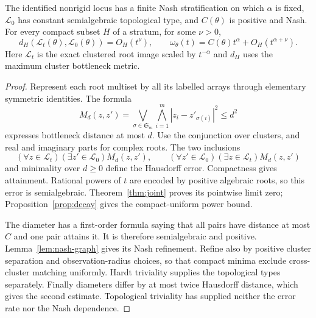 \begin{theorem}\label{thm:uniform}
The identified nonrigid locus has a finite Nash stratification on which
$\alpha$ is fixed, $\mathcal L_0$ has constant semialgebraic topological
type, and $C(\theta)$ is positive and Nash. For every compact subset $H$
of a stratum, for some $\nu>0$,
\begin{equation}\label{eq:uniform-law}
 d_H(\mathcal L_t(\theta),\mathcal L_0(\theta))=O_H(t^\nu),\qquad
 \omega_\theta(t)=C(\theta)t^\alpha+O_H(t^{\alpha+\nu}).
\end{equation}
Here $\mathcal L_t$ is the exact clustered root image scaled by
$t^{-\alpha}$ and $d_H$ uses the maximum cluster bottleneck metric.
\end{theorem}
\begin{proof}
Represent each root multiset by all its labelled arrays through elementary
symmetric identities. The formula
\begin{equation}\label{eq:matching-formula}
 M_d(z,z')=\bigvee_{\sigma\in\mathfrak S_m}
              \bigwedge_{i=1}^m |z_i-z'_{\sigma(i)}|^2\le d^2
\end{equation}
expresses bottleneck distance at most $d$. Use the conjunction over
clusters, and real and imaginary parts for complex roots. The two
inclusions
\[
 (\forall z\in\mathcal L_t)(\exists z'\in\mathcal L_0)M_d(z,z'),
 \qquad
 (\forall z'\in\mathcal L_0)(\exists z\in\mathcal L_t)M_d(z,z')
\]
and minimality over $d\ge0$ define the Hausdorff error. Compactness gives
attainment. Rational powers of $t$ are encoded by positive algebraic
roots, so this error is semialgebraic. Theorem~\ref{thm:joint} proves
its pointwise limit zero; Proposition~\ref{prop:decay} gives the
compact-uniform power bound.

The diameter has a first-order formula saying that all pairs have distance
at most $C$ and one pair attains it. It is therefore semialgebraic and
positive. Lemma~\ref{lem:nash-graph} gives its Nash refinement. Refine
also by positive cluster separation and observation-radius choices, so
that compact minima exclude cross-cluster matching uniformly. Hardt
triviality supplies the topological types separately. Finally diameters
differ by at most twice Hausdorff distance, which gives the second
estimate. Topological triviality has supplied neither the error rate nor
the Nash dependence.
\end{proof}

